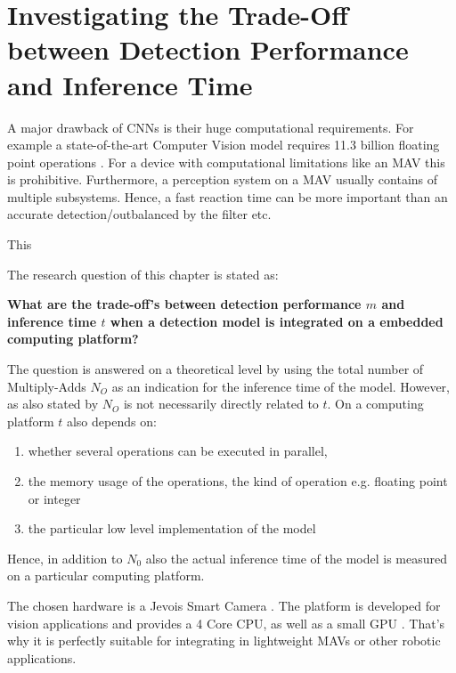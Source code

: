 \chapter{Investigating the Trade-Off between Detection Performance and Inference Time}
\label{sec:tradeoff}

A major drawback of \acp{CNN} is their huge computational requirements. For example a state-of-the-art Computer Vision model \cite{He2015} requires 11.3 billion floating point operations \cite{Tschannen2017}. For a device with computational limitations like an \ac{MAV} this is prohibitive. Furthermore, a perception system on a \ac{MAV} usually contains of multiple subsystems. Hence, a fast reaction time can be more important than an accurate detection/outbalanced by the filter etc.

This

The research question of this chapter is stated as:

\begin{center}
	\textbf{What are the trade-off's between detection performance $m$ and inference time $t$ when a detection model is integrated on a embedded computing platform?}
\end{center}

The question is answered on a theoretical level by using the total number of \ac{Multiply-Adds} $N_O$ as an indication for the inference time of the model. However, as also stated by  $N_O$ is not necessarily directly related to $t$. On a computing platform $t$ also depends on:

\begin{enumerate}
	\item whether several operations can be executed in parallel,
	\item the memory usage of the operations, the kind of operation e.g. floating point or integer
	\item the particular low level implementation of the model
\end{enumerate} 

Hence, in addition to $N_0$ also the actual inference time of the model is measured on a particular computing platform.

The chosen hardware is a Jevois Smart Camera . The platform is developed for vision applications and provides a 4 Core CPU, as well as a small GPU . That's why it is perfectly suitable for integrating in lightweight \acp{MAV} or other robotic applications.

